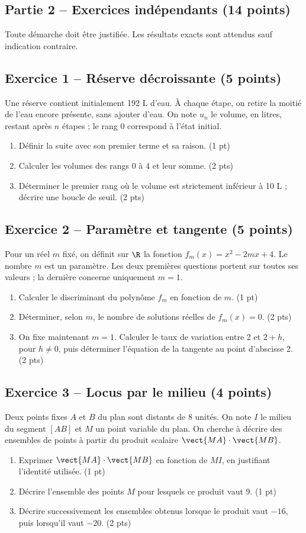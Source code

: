 \mxnewpage\subsection*{Partie 2 -- Exercices indépendants (14 points)}
Toute démarche doit être justifiée. Les résultats exacts sont attendus sauf indication contraire.
\subsection*{Exercice 1 -- Réserve décroissante (5 points)}
Une réserve contient initialement 192 L d’eau. À chaque étape, on retire la moitié de l’eau encore présente, sans ajouter d’eau. On note $u_n$ le volume, en litres, restant après $n$ étapes ; le rang 0 correspond à l’état initial.
\begin{enumerate}
\item Définir la suite avec son premier terme et sa raison. \hfill(1 pt)
\item Calculer les volumes des rangs 0 à 4 et leur somme. \hfill(2 pts)
\item Déterminer le premier rang où le volume est strictement inférieur à 10 L ; décrire une boucle de seuil. \hfill(2 pts)
\end{enumerate}
\subsection*{Exercice 2 -- Paramètre et tangente (5 points)}
Pour un réel $m$ fixé, on définit sur $\R$ la fonction $f_m(x)=x^2-2mx+4$. Le nombre $m$ est un paramètre. Les deux premières questions portent sur toutes ses valeurs ; la dernière concerne uniquement $m=1$.
\begin{enumerate}
\item Calculer le discriminant du polynôme $f_m$ en fonction de $m$. \hfill(1 pt)
\item Déterminer, selon $m$, le nombre de solutions réelles de $f_m(x)=0$. \hfill(2 pts)
\item On fixe maintenant $m=1$. Calculer le taux de variation entre 2 et $2+h$, pour $h\ne0$, puis déterminer l’équation de la tangente au point d’abscisse 2. \hfill(2 pts)
\end{enumerate}
\subsection*{Exercice 3 -- Locus par le milieu (4 points)}
Deux points fixes $A$ et $B$ du plan sont distants de 8 unités. On note $I$ le milieu du segment $[AB]$ et $M$ un point variable du plan. On cherche à décrire des ensembles de points à partir du produit scalaire $\vect{MA}\cdot\vect{MB}$.
\begin{enumerate}
\item Exprimer $\vect{MA}\cdot\vect{MB}$ en fonction de $MI$, en justifiant l’identité utilisée. \hfill(1 pt)
\item Décrire l’ensemble des points $M$ pour lesquels ce produit vaut 9. \hfill(1 pt)
\item Décrire successivement les ensembles obtenus lorsque le produit vaut $-16$, puis lorsqu'il vaut $-20$. \hfill(2 pts)
\end{enumerate}
